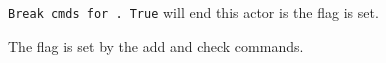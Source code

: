 \texttt{Break\ cmds\ for\ .\ True} will end this actor is the flag is
set.

The flag is set by the add and check commands.
